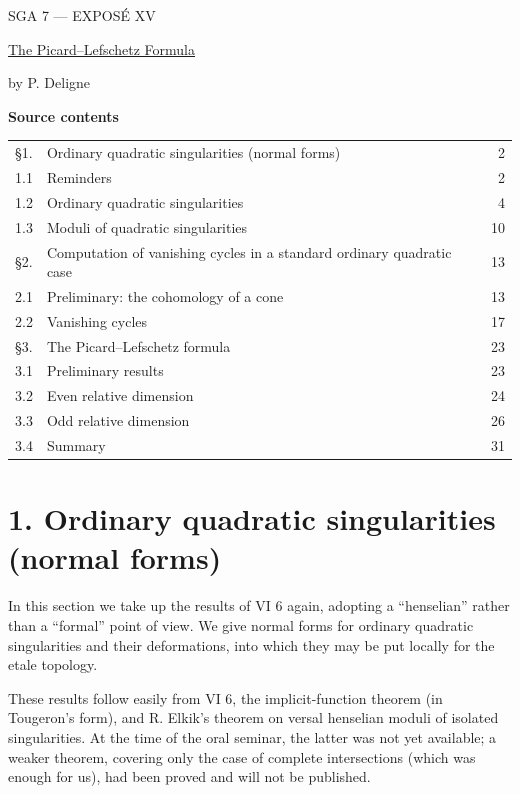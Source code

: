 \clearpage
\begin{center}
{\large SGA 7 --- EXPOS\'E XV}\par
\vspace{2em}
{\Large\underline{The Picard--Lefschetz Formula}}\par
\vspace{1.5em}
{\large by P. Deligne}
\end{center}

\medskip
\noindent\textbf{Source contents}
\begin{center}
\begin{tabular}{@{}llr@{}}
\S1. & Ordinary quadratic singularities (normal forms) & 2\\
1.1 & Reminders & 2\\
1.2 & Ordinary quadratic singularities & 4\\
1.3 & Moduli of quadratic singularities & 10\\
\S2. & Computation of vanishing cycles in a standard ordinary
  quadratic case & 13\\
2.1 & Preliminary: the cohomology of a cone & 13\\
2.2 & Vanishing cycles & 17\\
\S3. & The Picard--Lefschetz formula & 23\\
3.1 & Preliminary results & 23\\
3.2 & Even relative dimension & 24\\
3.3 & Odd relative dimension & 26\\
3.4 & Summary & 31
\end{tabular}
\end{center}

\section*{1. Ordinary quadratic singularities (normal forms)}

In this section we take up the results of VI 6 again, adopting a
``henselian'' rather than a ``formal'' point of view.  We give normal
forms for ordinary quadratic singularities and their deformations,
into which they may be put locally for the etale topology.

These results follow easily from VI 6, the implicit-function theorem
(in Tougeron's form), and R. Elkik's theorem on versal henselian
moduli of isolated singularities.  At the time of the oral seminar,
the latter was not yet available; a weaker theorem, covering only the
case of complete intersections (which was enough for us), had been
proved and will not be published.

